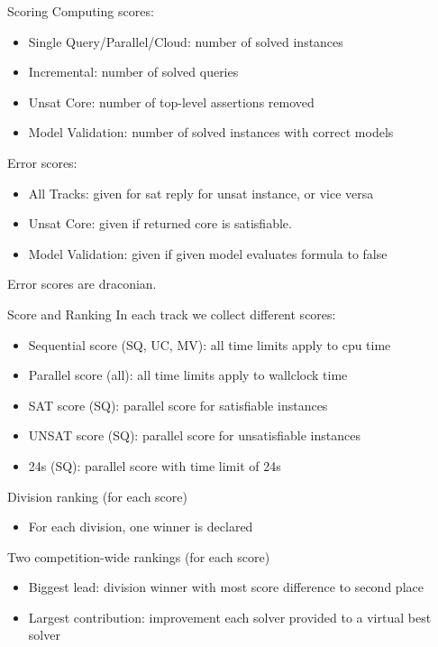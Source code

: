 \documentclass[table]{beamer}
\def\emph#1{\textcolor{MYblue}{#1}}
\begin{document}
\begin{frame}{Scoring}
  Computing scores:
  \begin{itemize}
  \item \emph{Single Query/Parallel/Cloud}: number of solved \emph{instances}
  \item \emph{Incremental}: number of solved \emph{queries}
  \item \emph{Unsat Core}: number of top-level assertions \emph{removed}
  \item \emph{Model Validation}: number of solved instances with correct \emph{models}
  \end{itemize}

  \bigskip
  Error scores:
  \begin{itemize}
  \item \emph{All Tracks}: given for sat reply for unsat instance, or vice versa
  \item \emph{Unsat Core}: given if returned core is satisfiable.
  \item \emph{Model Validation}: given if given model evaluates formula to \emph{false}
  \end{itemize}
  Error scores are draconian.
\end{frame}

\begin{frame}{Score and Ranking}
  In each track we collect different scores:
  \begin{itemize}
  \item \emph{Sequential score} (SQ, UC, MV): all time limits apply to cpu time
  \item \emph{Parallel score} (all): all time limits apply to wallclock time
  \item \emph{SAT score} (SQ): parallel score for \emph{satisfiable} instances
  \item \emph{UNSAT score} (SQ): parallel score for \emph{unsatisfiable} instances
  \item \emph{24s} (SQ): parallel score with time limit of \emph{24s}
  \end{itemize}
  \bigskip

  Division ranking (for each score)
  \begin{itemize}
  \item For each division, one winner is declared
  \end{itemize}

  \bigskip

  Two competition-wide rankings (for each score)
  \begin{itemize}
  \item \emph{Biggest lead}: division winner with most score difference to second place
  \item \emph{Largest contribution}: improvement each solver provided to a virtual best solver
  \end{itemize}

\end{frame}
\end{document}
